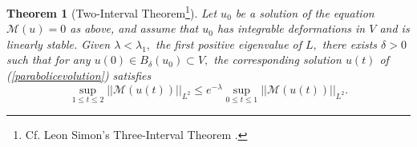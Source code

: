 \documentclass[12pt]{amsart}
\newcommand{\calM}{\mathcal{M}}
\renewcommand{\1}{{\mathbf 1}}
\newtheorem{thm}{Theorem}[section]
\theoremstyle{others}
\numberwithin{equation}{section}
\begin{document}
\begin{thm}[Two-Interval Theorem\footnote{Cf. Leon Simon's Three-Interval Theorem \cite[(4.11-4.12), p. 546]{Simon83}.}]\label{thm:twointerval} Let $u_0$ be a solution of the equation $\calM(u) = 0$ as above, and assume that $u_0$ has integrable deformations in $V$ and is linearly stable.
Given $\lambda < \lambda_1,$ the first positive eigenvalue of $L,$ there exists $\delta > 0$ such that for any $u(0) \in B_\delta (u_0) \subset V,$ the corresponding solution $u(t)$ of (\ref{parabolicevolution}) satisfies %
\begin{equation}\label{twointerval:est}
\sup_{1 \leq t \leq 2} ||\calM(u(t))||_{L^2} \leq e^{ -\lambda} \sup_{0 \leq t \leq 1} ||\calM(u(t))||_{L^2}.
\end{equation}
\end{thm}
\end{document}
